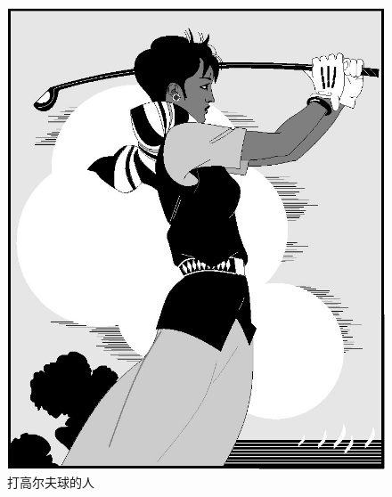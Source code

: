 \begin{figure}[htbp]
  \centering
  \begin{minipage}{0.4\textwidth}
    \centering
    \includegraphics[width=\textwidth]{golfer}
    \caption{打高尔夫球的人}
    \label{golfer2}
  \end{minipage}
  \centering
  \begin{minipage}{0.4\textwidth}
    \centering

\end{minipage}
\end{figure}
